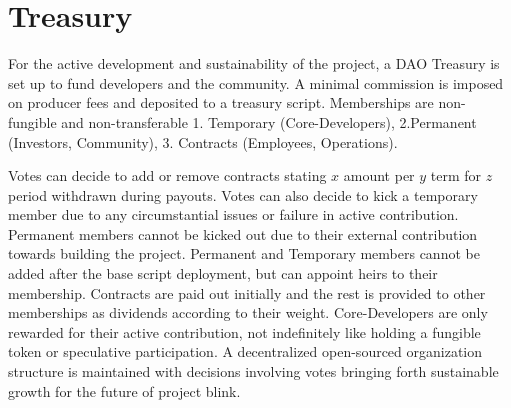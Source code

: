 \documentclass[../Bitcoin Blink.tex]{subfiles}
\begin{document}
\section{Treasury}
For the active development and sustainability of the project, a DAO Treasury is set up to fund developers and the community. A minimal commission is imposed on producer fees and deposited to a treasury script. Memberships are non-fungible and non-transferable 1. Temporary (Core-Developers), 2.Permanent (Investors, Community), 3. Contracts (Employees, Operations).

Votes can decide to add or remove contracts stating $x$ amount per $y$ term for $z$ period withdrawn during payouts. Votes can also decide to kick a temporary member due to any circumstantial issues or failure in active contribution. Permanent members cannot be kicked out due to their external contribution towards building the project. Permanent and Temporary members cannot be added after the base script deployment, but can appoint heirs to their membership. Contracts are paid out initially and the rest is provided to other memberships as dividends according to their weight. Core-Developers are only rewarded for their active contribution, not indefinitely like holding a fungible token or speculative participation. A decentralized open-sourced organization structure is maintained with decisions involving votes bringing forth sustainable growth for the future of project blink.
\end{document}
